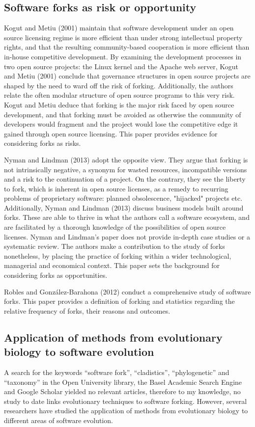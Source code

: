 \subsection{Software forks as risk or opportunity}
Kogut and Metiu (2001) maintain that software development under an open source licensing regime is more efficient than under strong intellectual property rights, and that the resulting community-based cooperation is more efficient than in-house competitive development. By examining the development processes in two open source projects: the Linux kernel and the Apache web server, Kogut and Metiu (2001) conclude that governance structures in open source projects are shaped by the need to ward off the risk of forking. Additionally, the authors relate the often modular structure of open source programs to this very risk. Kogut and Metiu deduce that forking is the major risk faced by open source development, and that forking must be avoided as otherwise the community of developers would fragment and the project would lose the competitive edge it gained through open source licensing. This paper provides evidence for considering forks as risks.

Nyman and Lindman (2013) adopt the opposite view. They argue that forking is not intrinsically negative, a synonym for wasted resources, incompatible versions and a risk to the continuation of a project. On the contrary, they see the liberty to fork, which is inherent in open source licenses, as a remedy to recurring problems of proprietary software: planned obsolescence, "hijacked" projects etc. Additionally, Nyman and Lindman (2013) discuss business models built around forks. These are able to thrive in what the authors call a software ecosystem, and are facilitated by a thorough knowledge of the possibilities of open source licenses. Nyman and Lindman's paper does not provide in-depth case studies or a systematic review. The authors make a contribution to the study of forks nonetheless, by placing the practice of forking within a wider technological, managerial and economical context. This paper sets the background for considering forks as opportunities.

Robles and González-Barahona (2012) conduct a comprehensive study of software forks. This paper provides a definition of forking and statistics regarding the relative frequency of forks, their reasons and outcomes.

\subsection{Application of methods from evolutionary biology to software evolution}
A search for the keywords “software fork”, “cladistics”, “phylogenetic” and “taxonomy” in the Open University library, the Basel Academic Search Engine and Google Scholar yielded no relevant articles, therefore to my knowledge, no study to date links evolutionary techniques to software forking. However, several researchers have studied the application of methods from evolutionary biology to different areas of software evolution.

